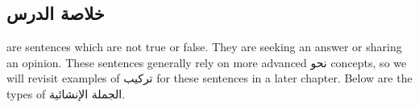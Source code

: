 \documentclass[../main.tex]{subfiles}
\begin{document}
\subsection{خلاصة الدرس}

\begin{english}
     are sentences which are not true or false. They are seeking an answer or sharing an opinion. These sentences generally rely on more advanced \textarabic{نحو} concepts, so we will revisit examples of \textarabic{تركيب} for these sentences in a later chapter. Below are the types of \textarabic{الجملة الإنشائية}.
\end{english}
\end{document}
